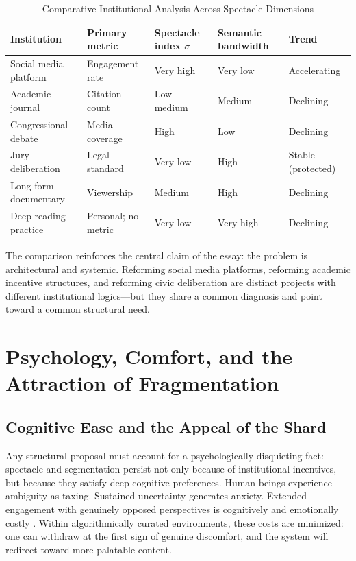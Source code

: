 \documentclass[12pt]{article}
\theoremstyle{definition}
\theoremstyle{plain}
\begin{document}
\begin{table}[h!]
\centering
\caption{Comparative Institutional Analysis Across Spectacle Dimensions}
\label{tab:comparison}
\renewcommand{\arraystretch}{1.4}
\begin{tabularx}{\textwidth}{@{}lXXXX@{}}
\toprule
\textbf{Institution} & \textbf{Primary metric} & \textbf{Spectacle index $\sigma$} & \textbf{Semantic bandwidth} & \textbf{Trend} \\
\midrule
Social media platform & Engagement rate & Very high & Very low & Accelerating \\
Academic journal & Citation count & Low--medium & Medium & Declining \\
Congressional debate & Media coverage & High & Low & Declining \\
Jury deliberation & Legal standard & Very low & High & Stable (protected) \\
Long-form documentary & Viewership & Medium & High & Declining \\
Deep reading practice & Personal; no metric & Very low & Very high & Declining \\
\bottomrule
\end{tabularx}
\end{table}

The comparison reinforces the central claim of the essay: the problem is architectural and systemic. Reforming social media platforms, reforming academic incentive structures, and reforming civic deliberation are distinct projects with different institutional logics---but they share a common diagnosis and point toward a common structural need.

\section{Psychology, Comfort, and the Attraction of Fragmentation}
\label{sec:psychology}

\subsection{Cognitive Ease and the Appeal of the Shard}

Any structural proposal must account for a psychologically disquieting fact: spectacle and segmentation persist not only because of institutional incentives, but because they satisfy deep cognitive preferences. Human beings experience ambiguity as taxing. Sustained uncertainty generates anxiety. Extended engagement with genuinely opposed perspectives is cognitively and emotionally costly \citep{Kahneman2011}. Within algorithmically curated environments, these costs are minimized: one can withdraw at the first sign of genuine discomfort, and the system will redirect toward more palatable content.
\end{document}
